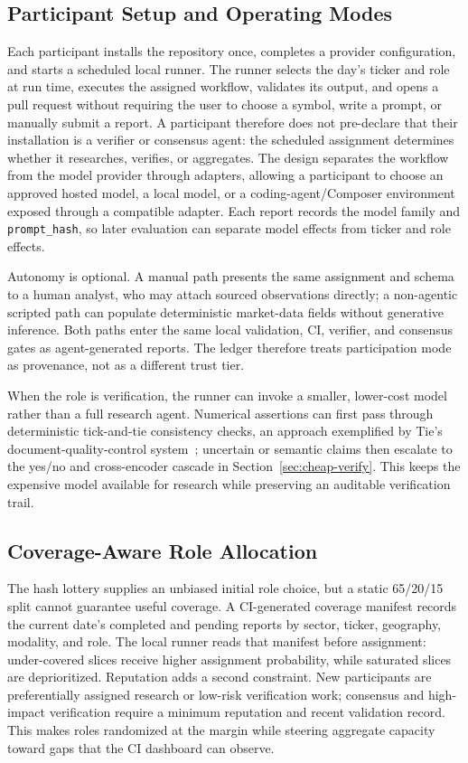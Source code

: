 \documentclass[10pt,twocolumn]{article}
\begin{document}
\subsection{Participant Setup and Operating Modes}

Each participant installs the repository once, completes a provider configuration, and starts a scheduled local runner. The runner selects the day's ticker and role at run time, executes the assigned workflow, validates its output, and opens a pull request without requiring the user to choose a symbol, write a prompt, or manually submit a report. A participant therefore does not pre-declare that their installation is a verifier or consensus agent: the scheduled assignment determines whether it researches, verifies, or aggregates. The design separates the workflow from the model provider through adapters, allowing a participant to choose an approved hosted model, a local model, or a coding-agent/Composer environment exposed through a compatible adapter. Each report records the model family and \texttt{prompt\_hash}, so later evaluation can separate model effects from ticker and role effects.

Autonomy is optional. A manual path presents the same assignment and schema to a human analyst, who may attach sourced observations directly; a non-agentic scripted path can populate deterministic market-data fields without generative inference. Both paths enter the same local validation, CI, verifier, and consensus gates as agent-generated reports. The ledger therefore treats participation mode as provenance, not as a different trust tier.

When the role is verification, the runner can invoke a smaller, lower-cost model rather than a full research agent. Numerical assertions can first pass through deterministic tick-and-tie consistency checks, an approach exemplified by Tie's document-quality-control system~\cite{tieqc}; uncertain or semantic claims then escalate to the yes/no and cross-encoder cascade in Section~\ref{sec:cheap-verify}. This keeps the expensive model available for research while preserving an auditable verification trail.

\subsection{Coverage-Aware Role Allocation}

The hash lottery supplies an unbiased initial role choice, but a static 65/20/15 split cannot guarantee useful coverage. A CI-generated coverage manifest records the current date's completed and pending reports by sector, ticker, geography, modality, and role. The local runner reads that manifest before assignment: under-covered slices receive higher assignment probability, while saturated slices are deprioritized. Reputation adds a second constraint. New participants are preferentially assigned research or low-risk verification work; consensus and high-impact verification require a minimum reputation and recent validation record. This makes roles randomized at the margin while steering aggregate capacity toward gaps that the CI dashboard can observe.
\end{document}
